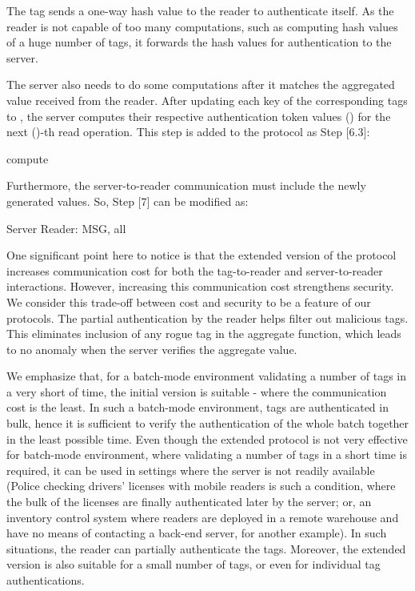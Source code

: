 \documentclass{easychair}
\begin{document}
The tag sends a one-way hash value to the reader to 
authenticate itself. As the reader is not capable of too many computations, such as 
computing hash values of a huge number of tags, it forwards the hash values for 
authentication to the server.

The server also needs to do some computations after it matches the aggregated 
value received from the reader. After updating each key  of the corresponding tags to , the server computes their 
respective authentication token values () for the next 
()-th read operation. This step is added to the protocol as Step [6.3]:

compute 

Furthermore, the server-to-reader communication must include the newly 
generated  values. So, Step [7] can be modified as:

 Server  Reader: MSG, all 



One significant point here to notice is that the extended version of the protocol 
increases communication cost for both the tag-to-reader and server-to-reader 
interactions. However, increasing this communication cost strengthens security. We consider this trade-off between 
cost and security to be a feature 
of our protocols. The partial authentication by the reader helps filter out 
malicious tags. This eliminates inclusion of any rogue tag in the aggregate 
function, which leads to no anomaly when the server verifies the aggregate 
value.

We emphasize that, for a batch-mode environment validating a number of 
tags in a very short of time, the initial version is suitable - where the 
communication cost is the least. In such a batch-mode environment, tags are 
authenticated in bulk, hence it is sufficient to verify the authentication of the 
whole batch together in the least possible time. Even though the extended protocol 
is not very effective for batch-mode environment, where validating a number of 
tags in a short time is required, it can be used in settings where 
the server is not readily available (Police checking drivers' licenses with 
mobile readers is such a condition, where the bulk of the licenses are finally 
authenticated later by the server; or, an inventory control system where readers 
are deployed in a remote warehouse and have no means of contacting a back-end 
server, for another example). In such situations, the reader can partially authenticate 
the tags. Moreover, the extended version is also suitable for a small number of 
tags, or even for individual
tag authentications. 
\end{document}
